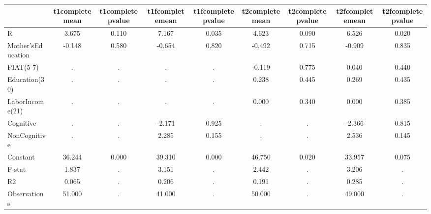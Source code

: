 \begin{table}[htbp]
\begin{tabular}{lcccccccc} \hline \hline
 & t1completemean  & t1completepvalue  & t1fcompletemean  & t1fcompletepvalue  & t2completemean  & t2completepvalue  & t2fcompletemean  & t2fcompletepvalue  \\  \hline 
R &     3.675 &     0.110 &     7.167 &     0.035 &     4.623 &     0.090 &     6.526 &     0.020 \\  
Mother'sEducation &    -0.148 &     0.580 &    -0.654 &     0.820 &    -0.492 &     0.715 &    -0.909 &     0.835 \\  
PIAT(5-7) &         . &         . &         . &         . &    -0.119 &     0.775 &     0.040 &     0.440 \\  
Education(30) &         . &         . &         . &         . &     0.238 &     0.445 &     0.269 &     0.435 \\  
LaborIncome(21) &         . &         . &         . &         . &     0.000 &     0.340 &     0.000 &     0.385 \\  
Cognitive &         . &         . &    -2.171 &     0.925 &         . &         . &    -2.366 &     0.815 \\  
NonCognitive &         . &         . &     2.285 &     0.155 &         . &         . &     2.536 &     0.145 \\  
Constant &    36.244 &     0.000 &    39.310 &     0.000 &    46.750 &     0.020 &    33.957 &     0.075 \\  
F-stat &     1.837 &         . &     3.151 &         . &     2.442 &         . &     3.206 &         . \\  
R2 &     0.065 &         . &     0.206 &         . &     0.191 &         . &     0.285 &         . \\  
Observations &    51.000 &         . &    41.000 &         . &    50.000 &         . &    49.000 &         . \\  
\hline \hline \end{tabular}
\end{table}
